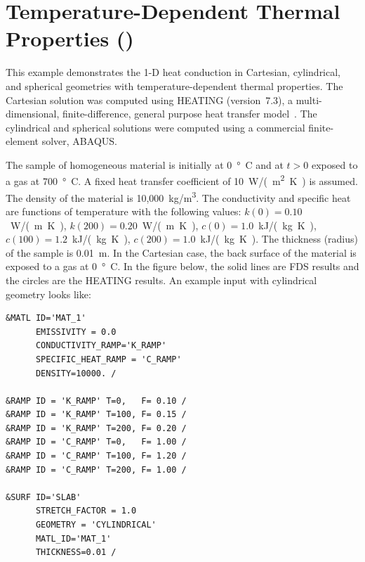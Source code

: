 \documentclass[11pt]{book}
\begin{document}
\section{Temperature-Dependent Thermal Properties (\texorpdfstring{}{heat\_conduction\_kc})}
\label{heat_conduction_kc}

This example demonstrates the 1-D heat conduction in Cartesian, cylindrical, and spherical geometries with temperature-dependent thermal properties.
The Cartesian solution was computed using HEATING (version~7.3), a multi-dimensional, finite-difference, general purpose heat transfer
model~\cite{Childs}. The cylindrical and spherical solutions were computed using a commercial finite-element solver, ABAQUS.

The sample of homogeneous material is initially at 0~\si{\degree C} and at $t>0$ exposed to a gas at 700~\si{\degree C}. A fixed heat transfer coefficient of
10~\si{W/(m^2.K)} is assumed. The density of the material is 10,000~\si{kg/m^3}. The conductivity and specific heat are functions of temperature with the
following values: $k(0)=0.10$~\si{W/(m.K)}, $k(200)=0.20$~\si{W/(m.K)}, $c(0)=1.0$~\si{kJ/(kg.K)}, $c(100)=1.2$~\si{kJ/(kg.K)}, $c(200)=1.0$~\si{kJ/(kg.K)}. The thickness (radius) of
the sample is 0.01~m. In the Cartesian case, the back surface of the material is exposed to a gas at 0~\si{\degree C}. In the figure below, the solid
lines are FDS results and the circles are the HEATING results. An example input with cylindrical geometry looks like:

\begin{lstlisting}
&MATL ID='MAT_1'
      EMISSIVITY = 0.0
      CONDUCTIVITY_RAMP='K_RAMP'
      SPECIFIC_HEAT_RAMP = 'C_RAMP'
      DENSITY=10000. /

&RAMP ID = 'K_RAMP' T=0,   F= 0.10 /
&RAMP ID = 'K_RAMP' T=100, F= 0.15 /
&RAMP ID = 'K_RAMP' T=200, F= 0.20 /
&RAMP ID = 'C_RAMP' T=0,   F= 1.00 /
&RAMP ID = 'C_RAMP' T=100, F= 1.20 /
&RAMP ID = 'C_RAMP' T=200, F= 1.00 /

&SURF ID='SLAB'
      STRETCH_FACTOR = 1.0
      GEOMETRY = 'CYLINDRICAL'
      MATL_ID='MAT_1'
      THICKNESS=0.01 /
\end{lstlisting}
\end{document}
